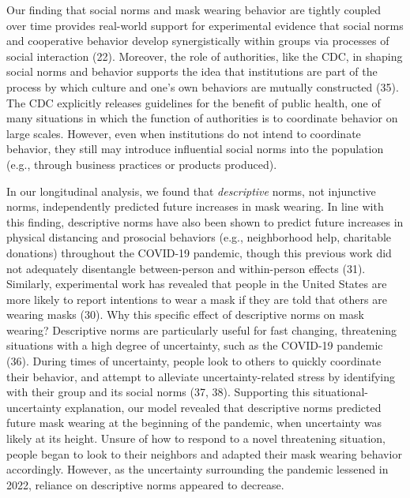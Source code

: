 \documentclass[
  man,floatsintext]{apa6}
\begin{document}
Our finding that social norms and mask wearing behavior are tightly coupled over time provides real-world support for experimental evidence that social norms and cooperative behavior develop synergistically within groups via processes of social interaction (22). Moreover, the role of authorities, like the CDC, in shaping social norms and behavior supports the idea that institutions are part of the process by which culture and one's own behaviors are mutually constructed (35). The CDC explicitly releases guidelines for the benefit of public health, one of many situations in which the function of authorities is to coordinate behavior on large scales. However, even when institutions do not intend to coordinate behavior, they still may introduce influential social norms into the population (e.g., through business practices or products produced).

In our longitudinal analysis, we found that \emph{descriptive} norms, not injunctive norms, independently predicted future increases in mask wearing. In line with this finding, descriptive norms have also been shown to predict future increases in physical distancing and prosocial behaviors (e.g., neighborhood help, charitable donations) throughout the COVID-19 pandemic, though this previous work did not adequately disentangle between-person and within-person effects (31). Similarly, experimental work has revealed that people in the United States are more likely to report intentions to wear a mask if they are told that others are wearing masks (30). Why this specific effect of descriptive norms on mask wearing? Descriptive norms are particularly useful for fast changing, threatening situations with a high degree of uncertainty, such as the COVID-19 pandemic (36). During times of uncertainty, people look to others to quickly coordinate their behavior, and attempt to alleviate uncertainty-related stress by identifying with their group and its social norms (37, 38). Supporting this situational-uncertainty explanation, our model revealed that descriptive norms predicted future mask wearing at the beginning of the pandemic, when uncertainty was likely at its height. Unsure of how to respond to a novel threatening situation, people began to look to their neighbors and adapted their mask wearing behavior accordingly. However, as the uncertainty surrounding the pandemic lessened in 2022, reliance on descriptive norms appeared to decrease.
\end{document}
